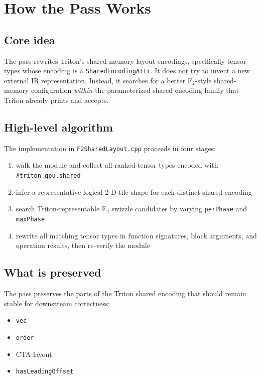 \documentclass[11pt,a4paper]{article}
\begin{document}
\section{How the Pass Works}

\subsection{Core idea}

The pass rewrites Triton's shared-memory layout encodings, specifically tensor
types whose encoding is a \texttt{SharedEncodingAttr}.  It does not try to
invent a new external IR representation.  Instead, it searches for a better
F$_2$-style shared-memory configuration \emph{within} the parameterized shared
encoding family that Triton already prints and accepts.

\subsection{High-level algorithm}

The implementation in \texttt{F2SharedLayout.cpp} proceeds in four stages:

\begin{enumerate}
\item walk the module and collect all ranked tensor types encoded with
      \texttt{\#triton\_gpu.shared}
\item infer a representative logical 2-D tile shape for each distinct shared
      encoding
\item search Triton-representable F$_2$ swizzle candidates by varying
      \texttt{perPhase} and \texttt{maxPhase}
\item rewrite all matching tensor types in function signatures, block
      arguments, and operation results, then re-verify the module
\end{enumerate}

\subsection{What is preserved}

The pass preserves the parts of the Triton shared encoding that should remain
stable for downstream correctness:

\begin{itemize}
\item \texttt{vec}
\item \texttt{order}
\item CTA layout
\item \texttt{hasLeadingOffset}
\end{itemize}
\end{document}
